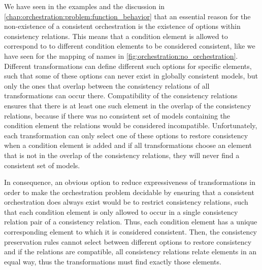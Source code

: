 
We have seen in the examples and the discussion in \autoref{chap:orchestration:problem:function_behavior} that an essential reason for the non-existence of a consistent orchestration is the existence of options within consistency relations.
This means that a condition element is allowed to correspond to to different condition elements to be considered consistent, like we have seen for the mapping of names in \autoref{fig:orchestration:no_orchestration}.
Different transformations can define different such options for specific elements, such that some of these options can never exist in globally consistent models, but only the ones that overlap between the consistency relations of all transformations can occur there.
Compatibility of the consistency relations ensures that there is at least one such element in the overlap of the consistency relations, because if there was no consistent set of models containing the condition element the relations would be considered incompatible.
Unfortunately, each transformation can only select one of these options to restore consistency when a condition element is added and if all transformations choose an element that is not in the overlap of the consistency relations, they will never find a consistent set of models.

In consequence, an obvious option to reduce expressiveness of transformations in order to make the orchestration problem decidable by ensuring that a consistent orchestration does always exist would be to restrict consistency relations, such that each condition element is only allowed to occur in a single consistency relation pair of a consistency relation.
Thus, each condition element has a unique corresponding element to which it is considered consistent.
Then, the consistency preservation rules cannot select between different options to restore consistency and if the relations are compatible, all consistency relations relate elements in an equal way, thus the transformations must find exactly those elements.

